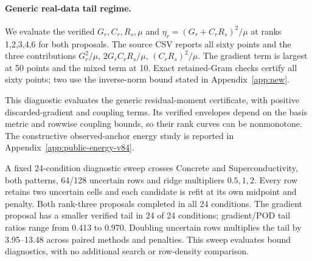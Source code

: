 \paragraph{Generic real-data tail regime.}
We evaluate the verified $G_r,C_r,R_s,\mu$ and $\eta_r=(G_r+C_rR_s)^2/\mu$ at ranks 1,2,3,4,6 for both proposals. The source CSV reports all sixty points and the three contributions $G_r^2/\mu$, $2G_rC_rR_s/\mu$, $(C_rR_s)^2/\mu$. The gradient term is largest at 50 points and the mixed term at 10. Exact retained-Gram checks certify all sixty points; two use the inverse-norm bound stated in Appendix~\ref{app:new}.

This diagnostic evaluates the generic residual-moment certificate, with positive discarded-gradient and coupling terms. Its verified envelopes depend on the basis metric and rowwise coupling bounds, so their rank curves can be nonmonotone. The constructive observed-anchor energy study is reported in Appendix~\ref{app:public-energy-v84}.

\begin{table}[t]\centering\small
\caption{Residual-gradient rank curve for the six original conditions. Entries are verified $\eta_r$ in $10^{-6}$ units; the accompanying CSV reports every constant and both proposals.}\label{tab:rank-v77}
\end{table}

A fixed 24-condition diagnostic sweep crosses Concrete and Superconductivity, both patterns, 64/128 uncertain rows and ridge multipliers $0.5,1,2$. Every row retains two uncertain cells and each candidate is refit at its own midpoint and penalty. Both rank-three proposals completed in all 24 conditions. The gradient proposal has a smaller verified tail in 24 of 24 conditions; gradient/POD tail ratios range from 0.413 to 0.970. Doubling uncertain rows multiplies the tail by 3.95--13.48 across paired methods and penalties. This sweep evaluates bound diagnostics, with no additional search or row-density comparison.
